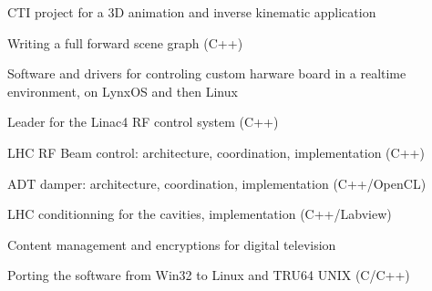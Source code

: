 \documentclass[a4paper]{deedy-resume} %
\begin{document}
\begin{minipage}[t]{0.66\textwidth}
\sectionspace %



CTI project for a 3D animation and inverse kinematic application
\begin{tightitemize}
\item Writing a full forward scene graph (C++)
\end{tightitemize}

\sectionspace %



Software and drivers for controling custom harware board in a realtime
environment, on LynxOS and then Linux
\begin{tightitemize}
\item Leader for the Linac4 RF control system (C++)
\item LHC RF Beam control: architecture, coordination, implementation (C++)
\item ADT damper: architecture, coordination, implementation (C++/OpenCL)
\item LHC conditionning for the cavities, implementation (C++/Labview)
\end{tightitemize}

\sectionspace %



Content management and encryptions for digital television
\begin{tightitemize}
\item Porting the software from Win32 to Linux and TRU64 UNIX (C/C++)
\end{tightitemize}

\sectionspace %




\end{minipage}
\end{document}
